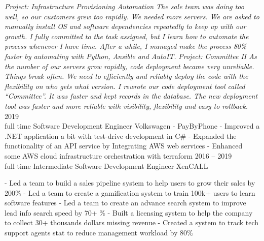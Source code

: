 \documentclass[9pt]{developercv} %
\begin{document}
\begin{entrylist}
{            \textit{Project: Infrastructure Provisioning Automation\newline
            The sale team was doing too well, so our customers grew too rapidly. We needed more servers.  
            We are asked to manually install OS and software dependencies repeatedly to keep up with our growth. I fully committed to the task assigned, but I learn how to automate the process whenever I have time. After a while, I managed make the process 80\% faster by automating with Python, Ansible and AutoIT.\newline\newline}
            \textit{Project: Committee II\newline
            As the number of our servers grow rapidly, code deployment became very unreliable. Things break often. We need to efficiently and reliably deploy the code with the flexibility on who gets what version. I rewrote our code deployment tool called “Committee”. It was faster and kept records in the database. The new deployment tool was faster and more reliable with visibility, flexibility and easy to rollback.\newline}
        }
	\entry
		{2019\\\footnotesize{full time}}
		{Software Development Engineer}
		{Volkswagen - PayByPhone}
		{
            - Improved a .NET application a bit with test-drive development in C\#\newline
            - Expanded the functionality of an API service by Integrating AWS web services\newline 
            - Enhanced some AWS cloud infrastructure orchestration with terraform\newline
        }
	\entry
		{2016 -- 2019\\\footnotesize{full time}}
		{Intermediate Software Development Engineer}
		{XenCALL}
		{
            - Led a team to build a sales pipeline system to help users to grow their sales by 200\%\newline
            - Led a team to create a gamification system to train 100k+ users to learn software features\newline
            - Led a team to create an advance search system to improve lead info search speed by 70+ \%\newline
            - Built a licensing system to help the company to collect 30+ thousands dollars missing revenue\newline
            - Created a system to track tech support agents stat to reduce management workload by 80\%\newline

}
\end{entrylist}
\end{document}
